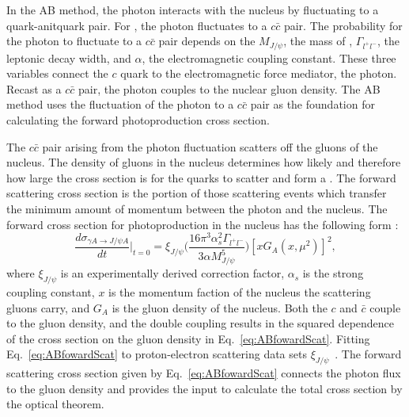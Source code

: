     In the AB method, the photon interacts with the nucleus by fluctuating to 
      a quark-anitquark pair.
    For \JPsi{}, the photon fluctuates to a $c\bar{c}$ pair. 
    The probability for the photon to fluctuate to a $c\bar{c}$ pair
      depends on the $M_{J/\psi}$, the mass of \JPsi{}, $\Gamma_{l^{+}l^{-}}$, 
      the \JPsi{} leptonic decay width, and $\alpha$, the electromagnetic 
      coupling constant.
    These three variables connect the $c$ quark to the electromagnetic force 
      mediator, the photon. 
    Recast as a $c\bar{c}$ pair, the photon couples to the nuclear gluon 
      density.
    The AB method uses the fluctuation of the photon to a $c\bar{c}$ 
      pair as the foundation for calculating the forward \JPsi{} 
      photoproduction cross section. 

    The $c\bar{c}$ pair arising from the photon fluctuation scatters off the 
      gluons of the nucleus. 
    The density of gluons in the nucleus determines how likely and therefore 
      how large the cross section is for the quarks to scatter and form a 
      \JPsi{}.
    The forward scattering cross section is the portion of those scattering 
      events which transfer the minimum amount of momentum between the 
      photon and the nucleus. 
    The forward cross section for \JPsi{} photoproduction in the nucleus has 
      the following form \cite{pQCD2011.08}:
    \begin{equation} \label{eq:ABfowardScat}
      \frac{d\sigma_{\gamma A\rightarrow J/\psi A}}{dt}\Big|_{t=0}=\xi_{J/\psi}
        \Big(\frac{16\pi^{3}\alpha_{s}^{2}\Gamma_{l^{+}l^{-}}}{3\alpha 
        M_{J/\psi}^{5}}\Big)[xG_{A}(x,\mu^{2})]^{2},
    \end{equation}
      where $\xi_{J/\psi}$ is an experimentally derived 
      correction factor, $\alpha_{s}$ is the strong coupling constant, $x$ is 
      the momentum faction of the nucleus the scattering gluons carry, and 
      $G_{A}$ is the gluon density of the nucleus. 
    Both the $c$ and $\bar{c}$ couple to the gluon density, and the double 
      coupling results in the squared dependence of the cross section on the 
      gluon density in Eq.~\ref{eq:ABfowardScat}. 
    Fitting Eq.~\ref{eq:ABfowardScat} to proton-electron scattering data 
      sets $\xi_{J/\psi}$~\cite{pQCD2011.08}.
    The forward scattering cross section given by Eq.~\ref{eq:ABfowardScat} 
      connects the photon flux to the gluon density and provides the input to 
      calculate the total cross section by the optical theorem. 
    
